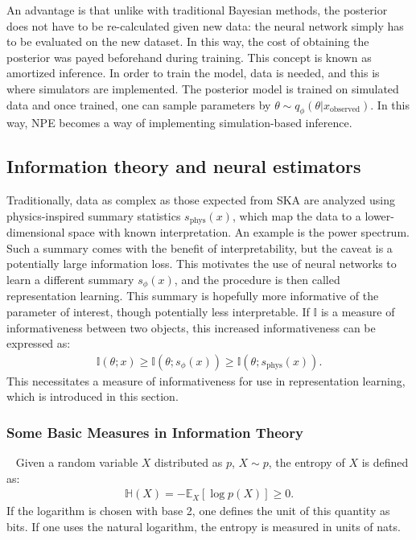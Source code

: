 An advantage is that unlike with traditional Bayesian methods, the posterior does not have to be re-calculated given new data: the neural network simply has to be evaluated on the new dataset. In this way, the cost of obtaining the posterior was payed beforehand during training. This concept is known as amortized inference. In order to train the model, data is needed, and this is where simulators are implemented. The posterior model is trained on simulated data and once trained, one can sample parameters by $\theta \sim q_\phi(\theta | x_{\text{observed}})$. In this way, NPE becomes a way of implementing simulation-based inference.

\subsection{Information theory and neural estimators}
Traditionally, data as complex as those expected from SKA are analyzed using physics-inspired summary statistics $s_\text{phys}(x)$, which map the data to a lower-dimensional space with known interpretation. An example is the power spectrum. Such a summary comes with the benefit of interpretability, but the caveat is a potentially large information loss. This motivates the use of neural networks to learn a different summary $s_\phi(x)$, and the procedure is then called representation learning. This summary is hopefully more informative of the parameter of interest, though potentially less interpretable. If $\mathbb{I}$ is a measure of informativeness between two objects, this increased informativeness can be expressed as:
\begin{align}
    \mathbb{I}(\theta;x) 
    \geq \mathbb{I}(\theta;s_\phi(x)) 
    \geq \mathbb{I}(\theta;s_{\text{phys}}(x)).
\end{align}
This necessitates a measure of informativeness for use in representation learning, which is introduced in this section.

\subsubsection*{Some Basic Measures in Information Theory}~\label{subsubsec:meas_IT}
Given a random variable $X$ distributed as $p$, $X \sim p$, the entropy of $X$ is defined as:
\begin{align}
\mathbb{H}(X) = -\mathbb{E}_{X} \left[ \log p(X) \right] \geq 0.
\end{align}
If the logarithm is chosen with base 2, one defines the unit of this quantity as bits. If one uses the natural logarithm, the entropy is measured in units of nats. 

